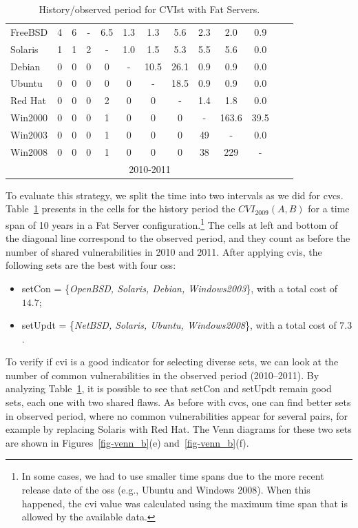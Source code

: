 \begin{table}[!ht]
\begin{center}
{\begin{tabular}{|l|c|c|c|c|c|c|c|c|c|c|c|c|}
FreeBSD & 4 & 6 & - & 6.5 & 1.3 & 1.3 & 5.6 & 2.3 & 2.0 & 0.9&\\ \cline{1-11}
Solaris & 1 & 1 & 2 & - & 1.0 & 1.5 & 5.3 & 5.5 & 5.6 & 0.0&\\ \cline{1-11}
Debian & 0 & 0 & 0 & 0 & - & 10.5 & 26.1 & 0.9 & 0.9 & 0.0&\\ \cline{1-11}
Ubuntu & 0 & 0 & 0 & 0 & 0 & - & 18.5 & 0.9 & 0.9 & 0.0&\\ \cline{1-11}
Red Hat & 0 & 0 & 0 & 2 & 0 & 0 &  - & 1.4 & 1.8 & 0.0&\\ \cline{1-11}
Win2000 & 0 & 0 & 0 & 1 & 0 & 0 & 0 & - & 163.6 & 39.5&\\ \cline{1-11}
Win2003 & 0 & 0 & 0 & 1 & 0 & 0 & 0 & 49 & - & 0.0 &\\ \cline{1-12}
Win2008 & 0 & 0 & 0 & 1 & 0 & 0 & 0 & 38 & 229 & - &\multicolumn{1}{|c}{}  \\ \cline{1-11}
 \multicolumn{1}{c|}{}& \multicolumn{9}{|c|}{2010-2011} & \multicolumn{2}{|c}{}\\ \cline{2-10}
\end{tabular}
\caption{History/observed period for CVIst with Fat Servers.}
\label{tab:strat_ii}
}
\end{center}
\end{table}

To evaluate this strategy, we split the time into two intervals as we did for \gls{cvcs}. 
Table~\ref{tab:strat_ii} presents in the cells for the history period the $\mathit{CVI}_{2009}(A,B)$ for a time span of 10 years in a Fat Server configuration.\footnote{In some cases, we had to use smaller time spans due to the more recent release date of the \glspl{os} (e.g., Ubuntu and Windows 2008). When this happened, the \gls{cvi} value was calculated using the maximum time span that is allowed by the available data.}
The cells at left and bottom of the diagonal line correspond to the observed period, and they count as before the number of shared vulnerabilities in 2010 and 2011. After applying \gls{cvis}, the following sets are the best with four \glspl{os}:

\begin{itemize}
\item setCon = \{\emph{OpenBSD, Solaris, Debian, Windows2003}\}, with a total cost of $14.7$;
\item setUpdt = \{\emph{NetBSD, Solaris, Ubuntu, Windows2008}\}, with a total cost of $7.3$.
\end{itemize}

To verify if \gls{cvi} is a good indicator for selecting diverse sets, we can look at the number of common vulnerabilities in the observed period (2010--2011). 
By analyzing Table~\ref{tab:strat_ii}, it is possible to see that setCon and setUpdt remain good sets, each one with two shared flaws. 
As before with \gls{cvcs}, one can find better sets in observed period, where no common vulnerabilities appear for several pairs, for example by replacing Solaris with Red Hat.
The Venn diagrams for these two sets are shown in Figures~\ref{fig-venn_b}(e) and~\ref{fig-venn_b}(f).

